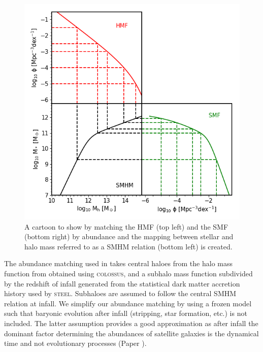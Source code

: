\begin{figure}[h]
    \centering
    \includegraphics[width = \linewidth]{Figures/Chapter2/AbundaceMatching.png}
    \caption{A cartoon to show by matching the HMF (top left) and the SMF (bottom right) by abundance and the mapping between stellar and halo mass referred to as a SMHM relation (bottom left) is created.}
    \label{fig:Abn_Toon}
\end{figure}

The abundance matching used in \steel takes central haloes from the halo mass function from \citet{Despali2016TheDefinitions} obtained using \textsc{colossus}\cite{Diemer2017COLOSSUS:Halos}, and a subhalo mass function subdivided by the redshift of infall generated from the statistical dark matter accretion history used by \textsc{steel}. Subhaloes are assumed to follow the central SMHM relation at infall. We simplify our abundance matching by using a frozen model such that baryonic evolution after infall (stripping, star formation, etc.) is not included. The latter assumption provides a good approximation as after infall the dominant factor determining the abundances of satellite galaxies is the dynamical time and not evolutionary processes (Paper ).

